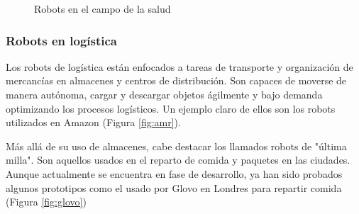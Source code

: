 \begin{figure} [ht!]
  \centering    
  \hspace{0.5cm}
  \hspace{0.5cm}
  \caption{Robots en el campo de la salud}
\end{figure}

\newpage
\subsubsection{Robots en logística}
Los robots de logística están enfocados a tareas de transporte y organización de mercancías en almacenes y centros de distribución. 
Son capaces de moverse de manera autónoma, cargar y descargar objetos ágilmente y bajo demanda optimizando los procesos logísticos. Un ejemplo 
claro de ellos son los robots utilizados en Amazon (Figura \ref{fig:amr}).

Más allá de su uso de almacenes, cabe destacar los llamados robots de "última milla". Son aquellos usados en el reparto de comida y 
paquetes en las ciudades. Aunque actualmente se encuentra en fase de desarrollo, ya han sido probados algunos 
prototipos como el usado por Glovo en Londres para repartir comida (Figura \ref{fig:glovo})

